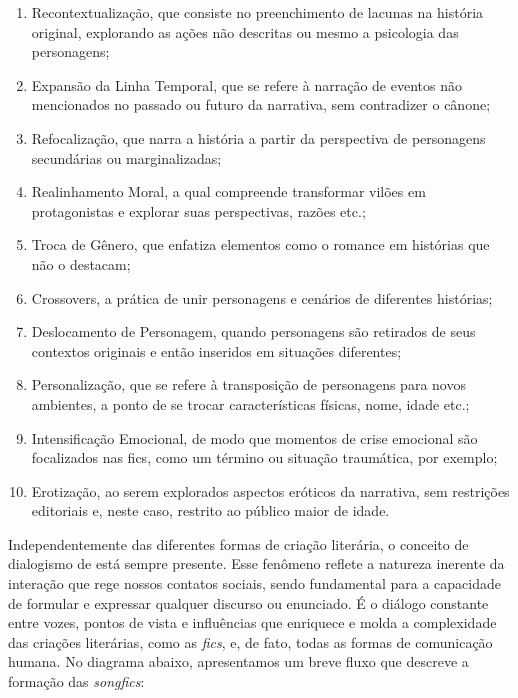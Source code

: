 \begin{enumerate}
\def\labelenumi{\arabic{enumi})}
\item
  Recontextualização, que consiste no preenchimento de lacunas na
  história original, explorando as ações não descritas ou mesmo a
  psicologia das personagens;
\item
  Expansão da Linha Temporal, que se refere à narração de eventos não
  mencionados no passado ou futuro da narrativa, sem contradizer o
  cânone;
\item
  Refocalização, que narra a história a partir da perspectiva de
  personagens secundárias ou marginalizadas;
\item
  Realinhamento Moral, a qual compreende transformar vilões em
  protagonistas e explorar suas perspectivas, razões etc.;
\item
  Troca de Gênero, que enfatiza elementos como o romance em histórias
  que não o destacam;
\item
  Crossovers, a prática de unir personagens e cenários de diferentes
  histórias;
\item
  Deslocamento de Personagem, quando personagens são retirados de seus
  contextos originais e então inseridos em situações diferentes;
\item
  Personalização, que se refere à transposição de personagens para novos
  ambientes, a ponto de se trocar características físicas, nome, idade
  etc.;
\item
  Intensificação Emocional, de modo que momentos de crise emocional são
  focalizados nas fics, como um término ou situação traumática, por
  exemplo;
\item
  Erotização, ao serem explorados aspectos eróticos da narrativa, sem
  restrições editoriais e, neste caso, restrito ao público maior de
  idade.
\end{enumerate}

Independentemente das diferentes formas de criação literária, o conceito
de dialogismo de \textcite{bakhtin2011} está sempre presente. Esse fenômeno
reflete a natureza inerente da interação que rege nossos contatos
sociais, sendo fundamental para a capacidade de formular e expressar
qualquer discurso ou enunciado. É o diálogo constante entre vozes,
pontos de vista e influências que enriquece e molda a complexidade das
criações literárias, como as \emph{fics}, e, de fato, todas as formas de
comunicação humana. No diagrama abaixo, apresentamos um breve fluxo que
descreve a formação das \emph{songfics}:

